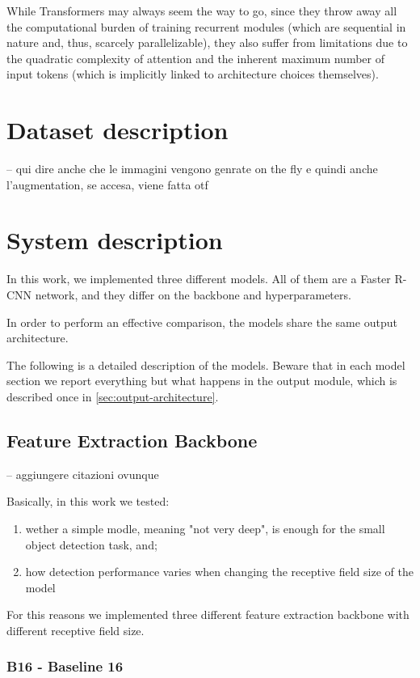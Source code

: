 \documentclass[a4paper,10pt]{report}
\begin{document}
While Transformers may always seem the way to go, since they throw away all the computational burden of training recurrent modules (which are sequential in nature and, thus, scarcely parallelizable), they also suffer from limitations due to the quadratic complexity of attention and the inherent maximum number of input tokens (which is implicitly linked to architecture choices themselves).

\chapter{Dataset description}\label{chap:dataset-description}

-- qui dire anche che le immagini vengono genrate on the fly e quindi anche l'augmentation, se accesa, viene fatta otf
\chapter{System description}\label{chap:system-description}

In this work, we implemented three different models. All of them are a Faster R-CNN network, and they differ on the backbone and hyperparameters.

In order to perform an effective comparison, the models share the same output architecture.

The following is a detailed description of the models. Beware that in each model section we report everything but what happens in the output module, which is described once in \ref{sec:output-architecture}.

\section{Feature Extraction Backbone}\label{sec:feature-extraction-backbone}
-- aggiungere citazioni ovunque

Basically, in this work we tested:
\begin{enumerate}
\item wether a simple modle, meaning "not very deep", is enough for the small object detection task, and;
\item how detection performance varies when changing the receptive field size of the model
\end{enumerate}

For this reasons we implemented three different feature extraction backbone with different receptive field size.

\subsection{B16 - Baseline 16}\label{subsec:b16}
\end{document}

